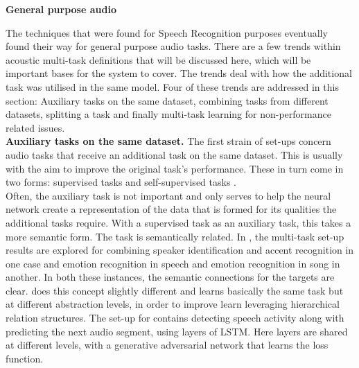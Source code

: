 \textbf{General purpose audio}

The techniques that were found for Speech Recognition purposes eventually found their way for general purpose audio tasks. There are a few trends within acoustic multi-task definitions that will be discussed here, which will be important bases for the system to cover.  The trends deal with how the additional task was utilised in the same model. Four of these trends are addressed in this section: Auxiliary tasks on the same dataset, combining tasks from different datasets, splitting a task and finally multi-task learning for non-performance related issues. \\

\textbf{Auxiliary tasks on the same dataset.} The first strain of set-ups concern audio tasks that receive an additional task on the same dataset. This is usually with the aim to improve the original task's performance. These in turn come in two forms: supervised tasks \citep{kim2017speech} \citep{zeng2019spectrogram} \citep{abrol2020learning} \citep{fernando2020temporarily} \citep{wu2020domain} \citep{sun2017compressed} \citep{lopez2019keyword} \citep{panchapagesan2016multi} and self-supervised tasks \citep{lee2019label}  \citep{deshmukh2020multi} \citep{lu2004multitask}.  \\

Often, the auxiliary task is not important and only serves to help the neural network create a representation of the data that is formed for its qualities the additional tasks require. With a supervised task as an auxiliary task, this takes a more semantic form. The task is semantically related. In \cite{zeng2019spectrogram}, the multi-task set-up results are explored for combining speaker identification and accent recognition in one case and emotion recognition in speech and emotion recognition in song in another. In both these instances, the semantic connections for the targets are clear.  \cite{abrol2020learning} does this concept slightly different and learns basically the same task but at different abstraction levels, in order to improve learn leveraging hierarchical relation structures. The set-up for \cite{fernando2020temporarily} contains detecting speech activity along with predicting the next audio segment, using layers of LSTM. Here layers  are shared at different levels, with a generative adversarial network that learns the loss function.\\


